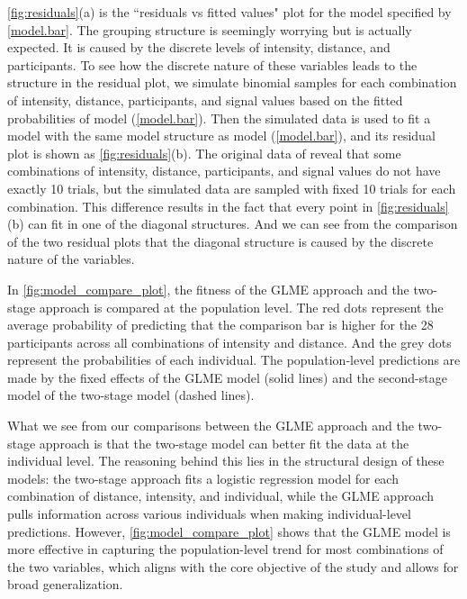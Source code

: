 \autoref{fig:residuals}(a) is the ``residuals vs fitted values" plot for the model specified by \autoref{model.bar}. The grouping structure is seemingly worrying but is actually expected. It is caused by the discrete levels of intensity, distance, and participants. To see how the discrete nature of these variables leads to the structure in the residual plot, we simulate binomial samples for each combination of intensity, distance, participants, and signal values based on the fitted probabilities of model (\autoref{model.bar}). Then the simulated data is used to fit a model with the same model structure as model (\autoref{model.bar}), and its residual plot is shown as \autoref{fig:residuals}(b). The original data of \cite{JNDVIS21} reveal that some combinations of intensity, distance, participants, and signal values do not have exactly 10 trials, but the simulated data are sampled with fixed 10 trials for each combination. This difference results in the fact that every point in \autoref{fig:residuals}(b) can fit in one of the diagonal structures. And we can see from the comparison of the two residual plots that the diagonal structure is caused by the discrete nature of the variables. 

In \autoref{fig:model_compare_plot}, the fitness of the GLME approach and the two-stage approach is compared at the population level. The red dots represent the average probability of predicting that the comparison bar is higher for the 28 participants across all combinations of intensity and distance. And the grey dots represent the probabilities of each individual. The population-level predictions are made by the fixed effects of the GLME model (solid lines) and the second-stage model of the two-stage model (dashed lines). 

What we see from our comparisons between the GLME approach and the two-stage approach is that the two-stage model can better fit the data at the individual level. The reasoning behind this lies in the structural design of these models: the two-stage approach fits a logistic regression model for each combination of distance, intensity, and individual, while the GLME approach pulls information across various individuals when making individual-level predictions. However, \autoref{fig:model_compare_plot} shows that the GLME model is more effective in capturing the population-level trend for most combinations of the two variables, which aligns with the core objective of the study and allows for broad generalization.


